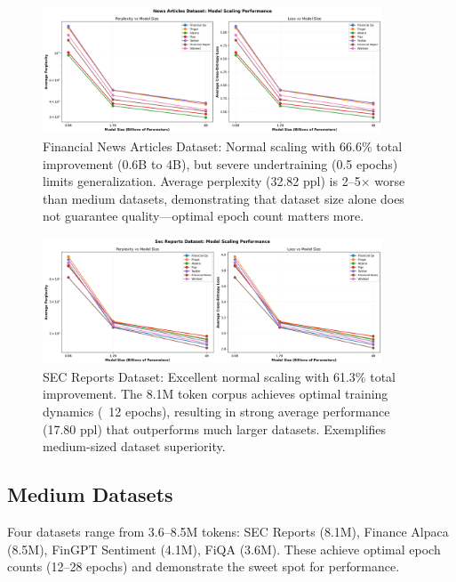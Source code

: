 \begin{figure}[htbp]
\centering
\includegraphics[width=0.9\textwidth]{figures/scaling_news_articles.png}
\caption[Financial News Dataset: Scaling Behavior]{Financial News Articles Dataset: Normal scaling with 66.6\% total improvement (0.6B to 4B), but severe undertraining (0.5 epochs) limits generalization. Average perplexity (32.82 ppl) is 2–5$\times$ worse than medium datasets, demonstrating that dataset size alone does not guarantee quality—optimal epoch count matters more.}
\label{fig:scaling_news_articles}
\end{figure}

\begin{figure}[htbp]
\centering
\includegraphics[width=0.9\textwidth]{figures/scaling_sec_reports.png}
\caption[SEC Reports Dataset: Scaling Behavior]{SEC Reports Dataset: Excellent normal scaling with 61.3\% total improvement. The 8.1M token corpus achieves optimal training dynamics (~12 epochs), resulting in strong average performance (17.80 ppl) that outperforms much larger datasets. Exemplifies medium-sized dataset superiority.}
\label{fig:scaling_sec_reports}
\end{figure}





\subsection{Medium Datasets}

Four datasets range from 3.6–8.5M tokens: SEC Reports (8.1M), Finance Alpaca (8.5M), FinGPT Sentiment (4.1M), FiQA (3.6M). These achieve optimal epoch counts (12–28 epochs) and demonstrate the sweet spot for performance.

